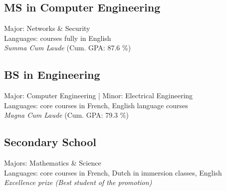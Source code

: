 \documentclass[]{deedy-resume-openfont}
\begin{document}
\begin{minipage}[t]{0.60\textwidth}
\subsection{MS in Computer Engineering}
Major: Networks \& Security \\
Languages: courses fully in English \\
\textit{Summa Cum Laude} (Cum. GPA: 87.6 \%) \\
\sectionsep

\subsection{BS in Engineering}
Major: Computer Engineering | Minor: Electrical Engineering \\
Languages: core courses in French, English language courses \\
\textit{Magna Cum Laude} (Cum. GPA: 79.3 \%) \\
\sectionsep

\subsection{Secondary School}
Majors: Mathematics \& Science \\
Languages: core courses in French, Dutch in immersion classes, English \\
\textit{Excellence prize (Best student of the promotion)}
\sectionsep




\end{minipage} 
\end{document}

